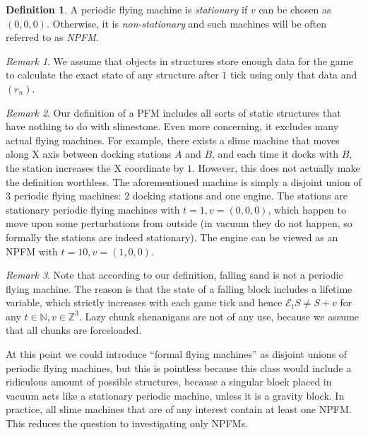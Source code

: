 \documentclass[12pt]{article}
\newcommand{\Z}{\mathbb{Z}}
\newcommand{\N}{\mathbb{N}}
\newcommand{\ev}{\mathcal{E}}
\theoremstyle{remark}
\newtheorem{remark}{Remark}
\theoremstyle{definition}
\newtheorem{definition}{Definition}
\begin{document}
\begin{definition}
    A periodic flying machine is \emph{stationary} if $v$ can be chosen as $(0, 0, 0)$. Otherwise, it is \emph{non-stationary} and such machines will be often referred to as \emph{NPFM}.
\end{definition}

\begin{remark}
    We assume that objects in structures store enough data for the game to calculate the exact state of any structure after $1$ tick using only that data and $(r_n)$.
\end{remark}

\begin{remark}
    Our definition of a PFM includes all sorts of static structures that have nothing to do with slimestone.
    Even more concerning, it excludes many actual flying machines. For example, there exists a slime machine that moves along X axis between docking stations $A$ and $B$, and each time it docks with $B$, the station increases the X coordinate by $1$. However, this does not actually make the definition worthless. The aforementioned machine is simply a disjoint union of $3$ periodic flying machines: $2$ docking stations and one engine. The stations are stationary periodic flying machines with $t = 1, v = (0, 0, 0)$, which happen to move upon some perturbations from outside (in vacuum they do not happen, so formally the stations are indeed stationary). The engine can be viewed as an NPFM with $t = 10, v = (1, 0, 0)$.
\end{remark}

\begin{remark} \label{falling_blocks}
    Note that according to our definition, falling sand is not a periodic flying machine.
    The reason is that the state of a falling block includes a lifetime variable, which strictly increases with each game tick and hence $\ev_tS \neq S+v$ for any $t \in \N, v \in \Z^3$.
    Lazy chunk shenanigans are not of any use, because we assume that all chunks are forceloaded.
\end{remark}

At this point we could introduce ``formal flying machines'' as disjoint unions of periodic flying machines, but this is pointless because this class would include a ridiculous amount of possible structures, because a singular block placed in vacuum acts like a stationary periodic machine, unless it is a gravity block.
In practice, all slime machines that are of any interest contain at least one NPFM. This reduces the question to investigating only NPFMs.
\end{document}
